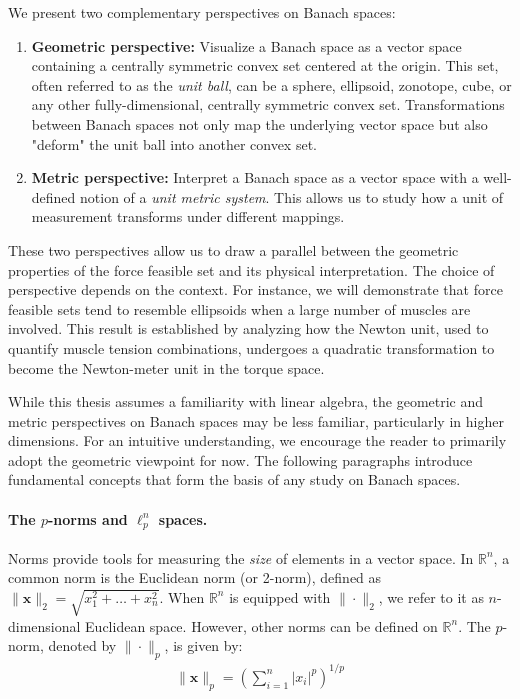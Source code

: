 We present two complementary perspectives on Banach spaces:

\begin{enumerate}
  \item{ \textbf{Geometric perspective:} Visualize a Banach space as a vector space containing a centrally symmetric convex set centered at the origin. This set, often referred to as the \emph{unit ball}, can be a sphere, ellipsoid, zonotope, cube, or any other fully-dimensional, centrally symmetric convex set.  Transformations between Banach spaces not only map the underlying vector space but also "deform" the unit ball into another convex set.}
  \item{ \textbf{Metric perspective:}  Interpret a Banach space as a vector space with a well-defined notion of a \emph{unit metric system}. This allows us to study how a unit of measurement transforms under different mappings.}
\end{enumerate}

These two perspectives allow us to draw a parallel between the geometric properties of the force feasible set and its physical interpretation. The choice of perspective depends on the context. For instance, we will demonstrate that force feasible sets tend to resemble ellipsoids when a large number of muscles are involved. This result is established by analyzing how the Newton unit, used to quantify muscle tension combinations, undergoes a quadratic transformation to become the Newton-meter unit in the torque space.

While this thesis assumes a familiarity with linear algebra, the geometric and metric perspectives on Banach spaces may be less familiar, particularly in higher dimensions. For an intuitive understanding, we encourage the reader to primarily adopt the geometric viewpoint for now. The following paragraphs introduce fundamental concepts that form the basis of any study on Banach spaces.

\paragraph*{The $p$-norms and $\ell_p^n$ spaces.} Norms provide tools for measuring the \emph{size} of elements in a vector space. In $\mathbb{R}^n$, a common norm is the Euclidean norm (or 2-norm), defined as $\|\mathbf{x}\|_2 = \sqrt{x_1^2 + \dots + x_n^2}$. When $\mathbb{R}^n$ is equipped with $\|\cdot \|_2$, we refer to it as $n$-dimensional Euclidean space. However, other norms can be defined on $\mathbb{R}^n$.  The $p$-norm, denoted by $\|\cdot \|_p$, is given by:
\begin{align*}
\|\mathbf{x}\|_p = \left(\sum_{i=1}^n \vert x_i \vert^{p}\right)^{1/p}
\end{align*}


